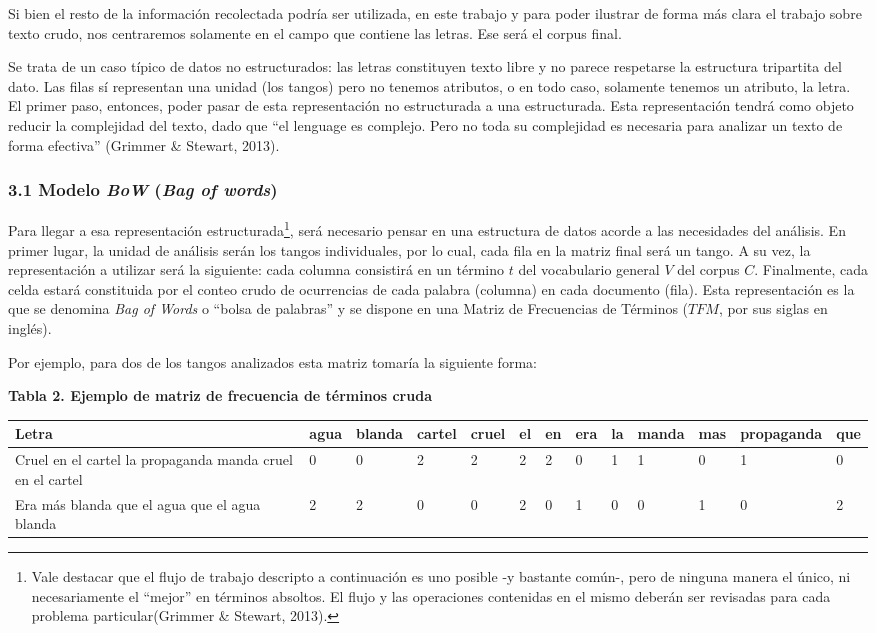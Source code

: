 \documentclass[]{article}
\let\rmarkdownfootnote\footnote%
\def\footnote{\protect\rmarkdownfootnote}
\begin{document}
Si bien el resto de la información recolectada podría ser utilizada, en
este trabajo y para poder ilustrar de forma más clara el trabajo sobre
texto crudo, nos centraremos solamente en el campo que contiene las
letras. Ese será el corpus final.

Se trata de un caso típico de datos no estructurados: las letras
constituyen texto libre y no parece respetarse la estructura tripartita
del dato. Las filas sí representan una unidad (los tangos) pero no
tenemos atributos, o en todo caso, solamente tenemos un atributo, la
letra. El primer paso, entonces, poder pasar de esta representación no
estructurada a una estructurada. Esta representación tendrá como objeto
reducir la complejidad del texto, dado que ``el lenguage es complejo.
Pero no toda su complejidad es necesaria para analizar un texto de forma
efectiva'' (Grimmer \& Stewart, 2013).

\subsubsection{\texorpdfstring{3.1 Modelo \emph{BoW} (\emph{Bag of
words})}{3.1 Modelo BoW (Bag of words)}}\label{modelo-bow-bag-of-words}

Para llegar a esa representación estructurada\footnote{Vale destacar que
  el flujo de trabajo descripto a continuación es uno posible -y
  bastante común-, pero de ninguna manera el único, ni necesariamente el
  ``mejor'' en términos absoltos. El flujo y las operaciones contenidas
  en el mismo deberán ser revisadas para cada problema
  particular(Grimmer \& Stewart, 2013).}, será necesario pensar en una
estructura de datos acorde a las necesidades del análisis. En primer
lugar, la unidad de análisis serán los tangos individuales, por lo cual,
cada fila en la matriz final será un tango. A su vez, la representación
a utilizar será la siguiente: cada columna consistirá en un término
\(t\) del vocabulario general \(V\) del corpus \(C\). Finalmente, cada
celda estará constituida por el conteo crudo de ocurrencias de cada
palabra (columna) en cada documento (fila). Esta representación es la
que se denomina \emph{Bag of Words} o ``bolsa de palabras'' y se dispone
en una Matriz de Frecuencias de Términos (\(TFM\), por sus siglas en
inglés).

Por ejemplo, para dos de los tangos analizados esta matriz tomaría la
siguiente forma:

\textbf{Tabla 2. Ejemplo de matriz de frecuencia de términos cruda}

\begin{longtable}[]{@{}lllllllllllll@{}}
\toprule
Letra & agua & blanda & cartel & cruel & el & en & era & la & manda &
mas & propaganda & que\tabularnewline
\midrule
\endhead
Cruel en el cartel la propaganda manda cruel en el cartel & 0 & 0 & 2 &
2 & 2 & 2 & 0 & 1 & 1 & 0 & 1 & 0\tabularnewline
Era más blanda que el agua que el agua blanda & 2 & 2 & 0 & 0 & 2 & 0 &
1 & 0 & 0 & 1 & 0 & 2\tabularnewline
\bottomrule
\end{longtable}
\end{document}

